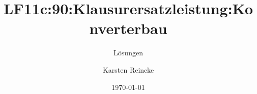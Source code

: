 \documentclass[]{beamer}
\title{LF11c:90:Klausurersatzleistung:Konverterbau}
\subtitle{Lösungen}
\institute{GS-LDK}
\author{Karsten Reincke}
\date{\today}
\def\cfgGl{../../../cfg.gl/}
\begin{document}

\begin{frame}
  \titlepage

  
\end{frame}






\logo{}
\newpage



%
\end{document}
